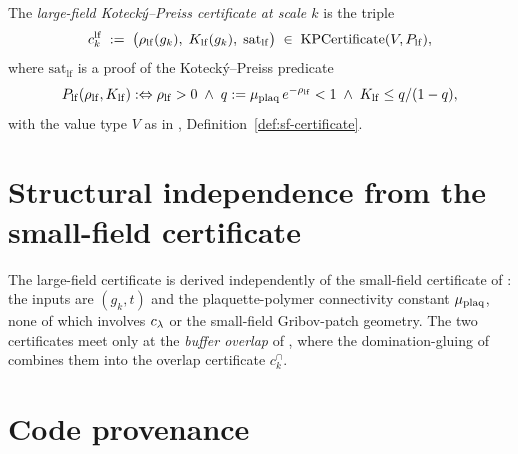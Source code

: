 \begin{definition}
\label{def:lf-certificate}
The \emph{large-field Kotecký--Preiss certificate at scale $k$} is
the triple
\begin{equation}
  \label{eq:lf-certificate}
  c_k^{\mathrm{lf}} \;:=\;
  \bigl(\rho_{\mathrm{lf}}(g_k),\; K_{\mathrm{lf}}(g_k),\; \mathrm{sat}_{\mathrm{lf}}\bigr)
  \;\in\; \mathrm{KPCertificate}(V, P_{\mathrm{lf}}),
\end{equation}
where $\mathrm{sat}_{\mathrm{lf}}$ is a proof of the Kotecký--Preiss
predicate
\[
  P_{\mathrm{lf}}(\rho_{\mathrm{lf}}, K_{\mathrm{lf}}) :\Leftrightarrow
  \rho_{\mathrm{lf}} > 0 \;\wedge\;
  q := \mu_{\mathrm{plaq}}\,e^{-\rho_{\mathrm{lf}}} < 1 \;\wedge\;
  K_{\mathrm{lf}} \le q/(1 - q),
\]
with the value type $V$ as in ,
Definition~\ref{def:sf-certificate}.
\end{definition}

\section{Structural independence from the small-field certificate}
\label{sec:lf-independence}

The large-field certificate is derived independently of the
small-field certificate of : the inputs are
$(g_k, t)$ and the plaquette-polymer connectivity constant
$\mu_{\mathrm{plaq}}$, none of which involves $c_\lambda$ or the small-field
Gribov-patch geometry.  The two certificates meet only at the
\emph{buffer overlap} of , where the
domination-gluing of  combines them into
the overlap certificate $c_k^{\cap}$.

\section{Code provenance}
\label{sec:lf-codeanchor}


